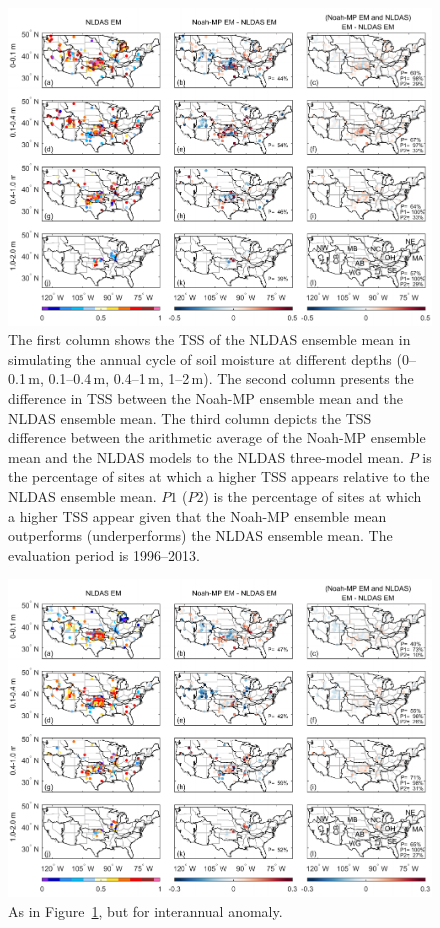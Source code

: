\documentclass[essd, manuscript]{copernicus}
\begin{document}
\begin{figure}[t]
  \includegraphics[width=17cm]{fig/fig05.pdf}
  \caption{The first column shows the TSS of the NLDAS ensemble mean in simulating the annual cycle of soil moisture at different depths (0--0.1\,m, 0.1--0.4\,m, 0.4--1\,m, 1--2\,m). The second column presents the difference in TSS between the Noah-MP ensemble mean and the NLDAS ensemble mean. The third column depicts the TSS difference between the arithmetic average of the Noah-MP ensemble mean and the NLDAS models to the NLDAS three-model mean. \(P\) is the percentage of sites at which a higher TSS appears relative to the NLDAS ensemble mean. \(P1\) (\(P2\)) is the percentage of sites at which a higher TSS appear given that the Noah-MP ensemble mean outperforms (underperforms) the NLDAS ensemble mean. The evaluation period is 1996--2013.}
  \label{fig:sm:ancy:tss}
\end{figure}

\begin{figure}[t]
  \includegraphics[width=17cm]{fig/fig06.pdf}
  \caption{As in Figure~\ref{fig:sm:ancy:tss}, but for interannual anomaly.}
  \label{fig:sm:anom:tss}
\end{figure}
\end{document}
